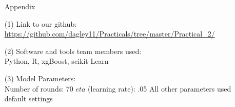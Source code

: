 \documentclass[12pt]{article}
\newcommand\tab[1][0.5cm]{\hspace*{#1}}
\begin{document}
\begin{enumerate}
\newpage
Appendix
\item[(1)]Link to our github:\\
\url{https://github.com/dagley11/Practicals/tree/master/Practical_2/}
\item[(2)]Software and tools team members used:\\
Python, R, xgBoost, scikit-Learn
\item[(3)]Model Parameters:\\
Number of rounds: 70 \newline
$eta$ (learning rate): .05 \newline
All other parameters used default settings \newline
\tab
\end{enumerate}
\end{document}
